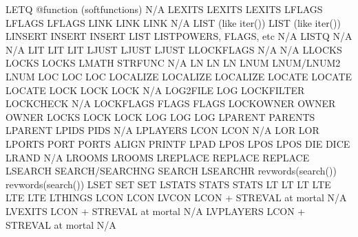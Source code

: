 \documentclass[letterpaper,10pt,english]{sphinxmanual}
\begin{document}
\begin{sphinxVerbatim}[commandchars=\\\{\}]
LETQ                    @function (softfunctions)    N/A
LEXITS                  LEXITS                       LEXITS
LFLAGS                  LFLAGS                       LFLAGS
LINK                    LINK                         LINK
N/A                     LIST (like iter())           LIST (like iter())
LINSERT                 INSERT                       INSERT
LIST                    LISTPOWERS, FLAGS, etc       N/A
LISTQ                   N/A                          N/A
LIT                     LIT                          LIT
LJUST                   LJUST                        LJUST
LLOCKFLAGS              N/A                          N/A
LLOCKS                  LOCKS                        LOCKS
LMATH                   STRFUNC                      N/A
LN                      LN                           LN
LNUM                    LNUM/LNUM2                   LNUM
LOC                     LOC                          LOC
LOCALIZE                LOCALIZE                     LOCALIZE
LOCATE                  LOCATE                       LOCATE
LOCK                    LOCK                         LOCK
N/A                     LOG2FILE                     LOG
LOCKFILTER              LOCKCHECK                    N/A
LOCKFLAGS               FLAGS                        FLAGS
LOCKOWNER               OWNER                        OWNER
LOCKS                   LOCK                         LOCK
LOG                     LOG                          LOG
LPARENT                 PARENTS                      LPARENT
LPIDS                   PIDS                         N/A
LPLAYERS                LCON                         LCON
N/A                     LOR                          LOR
LPORTS                  PORT                         PORTS
ALIGN                   PRINTF                       LPAD
LPOS                    LPOS                         LPOS
DIE                     DICE                         LRAND
N/A                     LROOMS                       LROOMS
LREPLACE                REPLACE                      REPLACE
LSEARCH                 SEARCH/SEARCHNG              SEARCH
LSEARCHR                revwords(search())           revwords(search())
LSET                    SET                          SET
LSTATS                  STATS                        STATS
LT                      LT                           LT
LTE                     LTE                          LTE
LTHINGS                 LCON                         LCON
LVCON                   LCON + STREVAL at mortal     N/A
LVEXITS                 LCON + STREVAL at mortal     N/A
LVPLAYERS               LCON + STREVAL at mortal     N/A

\end{sphinxVerbatim}
\end{document}
